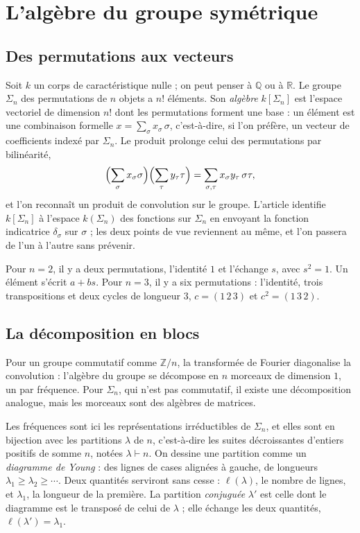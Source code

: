 \documentclass[11pt,a4paper]{amsart}
\theoremstyle{definition}
\theoremstyle{plain}
\theoremstyle{remark}
\newcommand{\Q}{\mathbb Q}
\begin{document}
\section{L'algèbre du groupe symétrique}

\subsection{Des permutations aux vecteurs}

Soit $k$ un corps de caractéristique nulle ; on peut penser à $\Q$ ou à $\mathbb R$. Le groupe $\Sigma_n$ des permutations de $n$ objets a $n!$ éléments. Son \emph{algèbre} $k[\Sigma_n]$ est l'espace vectoriel de dimension $n!$ dont les permutations forment une base : un élément est une combinaison formelle $x = \sum_\sigma x_\sigma\, \sigma$, c'est-à-dire, si l'on préfère, un vecteur de coefficients indexé par $\Sigma_n$. Le produit prolonge celui des permutations par bilinéarité,
\[
\Bigl(\sum_\sigma x_\sigma \sigma\Bigr)\Bigl(\sum_\tau y_\tau \tau\Bigr) = \sum_{\sigma, \tau} x_\sigma y_\tau\, \sigma\tau,
\]
et l'on reconnaît un produit de convolution sur le groupe. L'article identifie $k[\Sigma_n]$ à l'espace $k(\Sigma_n)$ des fonctions sur $\Sigma_n$ en envoyant la fonction indicatrice $\delta_\sigma$ sur $\sigma$ ; les deux points de vue reviennent au même, et l'on passera de l'un à l'autre sans prévenir.

Pour $n = 2$, il y a deux permutations, l'identité $1$ et l'échange $s$, avec $s^2 = 1$. Un élément s'écrit $a + b s$. Pour $n = 3$, il y a six permutations : l'identité, trois transpositions et deux cycles de longueur $3$, $c = (1\,2\,3)$ et $c^2 = (1\,3\,2)$.

\subsection{La décomposition en blocs}

Pour un groupe commutatif comme $\mathbb Z/n$, la transformée de Fourier diagonalise la convolution : l'algèbre du groupe se décompose en $n$ morceaux de dimension $1$, un par fréquence. Pour $\Sigma_n$, qui n'est pas commutatif, il existe une décomposition analogue, mais les morceaux sont des algèbres de matrices.

Les \og fréquences\fg{} sont ici les représentations irréductibles de $\Sigma_n$, et elles sont en bijection avec les partitions $\lambda$ de $n$, c'est-à-dire les suites décroissantes d'entiers positifs de somme $n$, notées $\lambda \vdash n$. On dessine une partition comme un \emph{diagramme de Young} : des lignes de cases alignées à gauche, de longueurs $\lambda_1 \ge \lambda_2 \ge \cdots$. Deux quantités serviront sans cesse : $\ell(\lambda)$, le nombre de lignes, et $\lambda_1$, la longueur de la première. La partition \emph{conjuguée} $\lambda'$ est celle dont le diagramme est le transposé de celui de $\lambda$ ; elle échange les deux quantités, $\ell(\lambda') = \lambda_1$.
\end{document}

